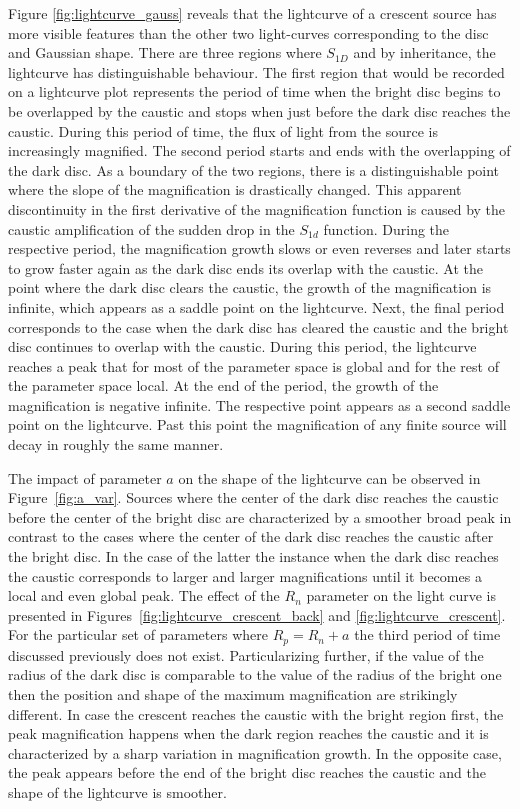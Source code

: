 \documentclass[usenatbib]{mn2e}
\begin{document}
Figure \ref{fig:lightcurve_gauss} reveals that the 
lightcurve of a crescent source has more
visible features than the other two light-curves corresponding to the
disc and Gaussian shape. There are three regions where $S_{1D}$ and by
inheritance, the lightcurve has distinguishable behaviour. The first
region that would be recorded on a lightcurve plot represents the
period of time when the bright disc begins to be overlapped by the
caustic and stops when just before the dark disc reaches the
caustic. During this period of time, the flux of light from the source
is increasingly magnified. The second period starts and ends with the
overlapping of the dark disc. As a boundary of the two regions, there
is a distinguishable point where the slope of the magnification is
drastically changed. This apparent discontinuity in the first
derivative of the magnification function is caused by the caustic
amplification of the sudden drop in the $S_{1d}$ function. During the
respective period, the magnification growth slows or even reverses
and later starts to grow faster again as
the dark disc ends its overlap with the caustic. At the point where
the dark disc clears the caustic, the growth of the magnification is
infinite, which appears as a saddle point on the lightcurve. Next, the
final period corresponds to the case when the dark disc has cleared
the caustic and the bright disc continues to overlap with the
caustic. During this period, the lightcurve reaches a peak that for
most of the parameter space is global and for the rest of the
parameter space local.  At the end of the period, the growth of the
magnification is negative infinite. The respective point appears as a
second saddle point on the lightcurve. Past this point the
magnification of any finite source will decay in roughly the same
manner.

The impact of parameter $a$ on the shape of the lightcurve can be
observed in Figure~\ref{fig:a_var}. Sources where the center of the
dark disc reaches the caustic before the center of the bright disc are
characterized by a smoother broad peak in contrast to the cases where
the center of the dark disc reaches the caustic after the bright disc.
In the case of the latter the instance when the dark disc reaches the
caustic corresponds to larger and larger magnifications until it
becomes a local and even global peak. The effect of the $R_n$
parameter on the light curve is presented in
Figures~\ref{fig:lightcurve_crescent_back} and
\ref{fig:lightcurve_crescent}. For the particular set of
parameters where $R_p = R_n +a$ the third period of time discussed
previously does not exist. Particularizing further, if the value of
the radius of the dark disc is comparable to the value of the radius
of the bright one then the position and shape of the maximum
magnification are strikingly different. In case the crescent reaches
the caustic with the bright region first, the peak magnification
happens when the dark region reaches the caustic and it is
characterized by a sharp variation in magnification growth. In the
opposite case, the peak appears before the end of the bright disc
reaches the caustic and the shape of the lightcurve is smoother.
\end{document}
